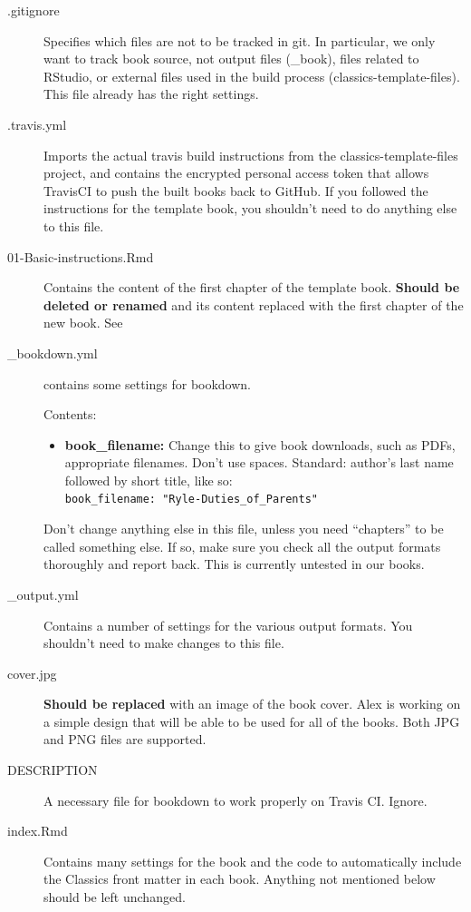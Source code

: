 \documentclass[
]{book}
\providecommand{\tightlist}{%
  \setlength{\itemsep}{0pt}\setlength{\parskip}{0pt}}
\begin{document}
\begin{description}
\item[.gitignore]
Specifies which files are not to be tracked in git. In particular, we only want to track book source, not output files (\_book), files related to RStudio, or external files used in the build process (classics-template-files). This file already has the right settings.
\item[.travis.yml]
Imports the actual travis build instructions from the classics-template-files project, and contains the encrypted personal access token that allows TravisCI to push the built books back to GitHub. If you followed the instructions for the template book, you shouldn't need to do anything else to this file.
\item[01-Basic-instructions.Rmd]
Contains the content of the first chapter of the template book. \textbf{Should be deleted or renamed} and its content replaced with the first chapter of the new book. See
\item[\_bookdown.yml]
contains some settings for bookdown.

Contents:

\begin{itemize}
\tightlist
\item
  \textbf{book\_filename:} Change this to give book downloads, such as PDFs, appropriate filenames. Don't use spaces. Standard: author's last name followed by short title, like so:\\
  \texttt{book\_filename:\ "Ryle-Duties\_of\_Parents"}
\end{itemize}

Don't change anything else in this file, unless you need ``chapters'' to be called something else. If so, make sure you check all the output formats thoroughly and report back. This is currently untested in our books.
\item[\_output.yml]
Contains a number of settings for the various output formats. You shouldn't need to make changes to this file.
\item[cover.jpg]
\textbf{Should be replaced} with an image of the book cover. Alex is working on a simple design that will be able to be used for all of the books. Both JPG and PNG files are supported.
\item[DESCRIPTION]
A necessary file for bookdown to work properly on Travis CI. Ignore.
\item[index.Rmd]
Contains many settings for the book and the code to automatically include the Classics front matter in each book. Anything not mentioned below should be left unchanged.


\end{description}
\end{document}

